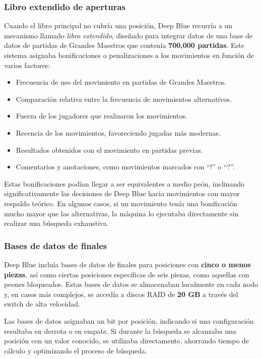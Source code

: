 \documentclass[12pt,a4paper]{article}
\begin{document}
\subsubsection*{Libro extendido de aperturas}
Cuando el libro principal no cubría una posición, Deep Blue recurría a un mecanismo llamado \textit{libro extendido}, diseñado para integrar datos de una base de datos de partidas de Grandes Maestros que contenía \textbf{700,000 partidas}. Este sistema asignaba bonificaciones o penalizaciones a los movimientos en función de varios factores:
\begin{itemize}
    \item Frecuencia de uso del movimiento en partidas de Grandes Maestros.
    \item Comparación relativa entre la frecuencia de movimientos alternativos.
    \item Fuerza de los jugadores que realizaron los movimientos.
    \item Recencia de los movimientos, favoreciendo jugadas más modernas.
    \item Resultados obtenidos con el movimiento en partidas previas.
    \item Comentarios y anotaciones, como movimientos marcados con ``!'' o ``?''.
\end{itemize}
Estas bonificaciones podían llegar a ser equivalentes a medio peón, inclinando significativamente las decisiones de Deep Blue hacia movimientos con mayor respaldo teórico. En algunos casos, si un movimiento tenía una bonificación mucho mayor que las alternativas, la máquina lo ejecutaba directamente sin realizar una búsqueda exhaustiva.

\subsubsection*{Bases de datos de finales}
Deep Blue incluía bases de datos de finales para posiciones con \textbf{cinco o menos piezas}, así como ciertas posiciones específicas de seis piezas, como aquellas con peones bloqueados. Estas bases de datos se almacenaban localmente en cada nodo y, en casos más complejos, se accedía a discos RAID de \textbf{20 GB} a través del switch de alta velocidad.

Las bases de datos asignaban un bit por posición, indicando si una configuración resultaba en derrota o en empate. Si durante la búsqueda se alcanzaba una posición con un valor conocido, se utilizaba directamente, ahorrando tiempo de cálculo y optimizando el proceso de búsqueda.
\end{document}
